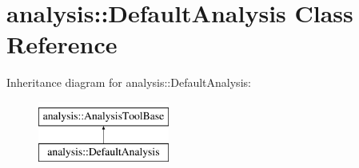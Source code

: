 \hypertarget{classanalysis_1_1DefaultAnalysis}{\section{analysis\-:\-:Default\-Analysis Class Reference}
\label{classanalysis_1_1DefaultAnalysis}
}
Inheritance diagram for analysis\-:\-:Default\-Analysis\-:\begin{figure}[H]
\begin{center}
\leavevmode
\includegraphics[height=2.000000cm]{classanalysis_1_1DefaultAnalysis}
\end{center}
\end{figure}
